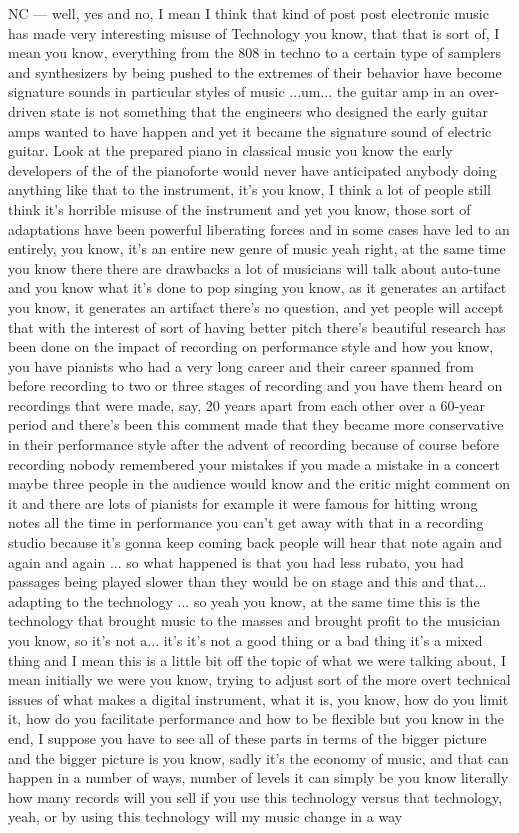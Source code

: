 NC — well, yes and no, I mean I think that kind of post post electronic music has made very interesting misuse of Technology you know, that that is sort of, I mean you know, everything from the 808 in techno to a certain type of samplers and synthesizers by being pushed to the extremes of their behavior have become signature sounds in particular styles of music ...um... the guitar amp in an over-driven state is not something that the engineers who designed the early guitar amps wanted to have happen and yet it became the signature sound of electric guitar. Look at the prepared piano in classical music you know the early developers of the of the pianoforte would never have anticipated anybody doing anything like that to the instrument, it's you know, I think a lot of people still think it's horrible misuse of the instrument and yet you know, those sort of adaptations have been powerful liberating forces and in some cases have led to an entirely, you know, it's an entire new genre of music yeah right, at the same time you know there there are drawbacks a lot of musicians will talk about auto-tune and you know what it's done to pop singing you know, as it generates an artifact you know, it generates an artifact there's no question, and yet people will accept that with the interest of sort of having better pitch there's beautiful research has been done on the impact of recording on performance style and how you know, you have pianists who had a very long career and their career spanned from before recording to two or three stages of recording and you have them heard on recordings that were made, say, 20 years apart from each other over a 60-year period and there's been this comment made that they became more conservative in their performance style after the advent of recording because of course before recording nobody remembered your mistakes if you made a mistake in a concert maybe three people in the audience would know and the critic might comment on it and there are lots of pianists for example it were famous for hitting wrong notes all the time in performance you can't get away with that in a recording studio because it's gonna keep coming back people will hear that note again and again and again ... so what happened is that you had less rubato, you had passages being played slower than they would be on stage and this and that... adapting to the technology ... so yeah you know, at the same time this is the technology that brought music to the masses and brought profit to the musician you know, so it's not a... it's it's not a good thing or a bad thing it's a mixed thing and I mean this is a little bit off the topic of what we were talking about, I mean initially we were you know, trying to adjust sort of the more overt technical issues of what makes a digital instrument, what it is, you know, how do you limit it, how do you facilitate performance and how to be flexible but you know in the end, I suppose you have to see all of these parts in terms of the bigger picture and the bigger picture is you know, sadly it's the economy of music, and that can happen in a number of ways, number of levels it can simply be you know literally how many records will you sell if you use this technology versus that technology, yeah, or by using this technology will my music change in a way 